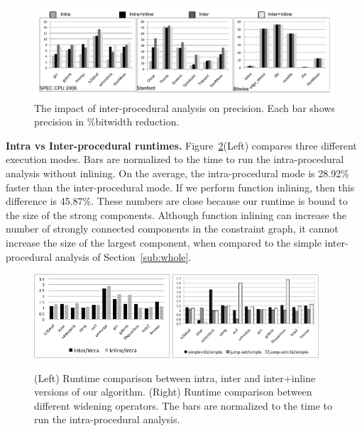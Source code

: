 \documentclass[preprint]{elsarticle}
\begin{document}
\begin{figure}[t!]
\begin{center}
\includegraphics[width=\textwidth]{images/wholeImpact}
\end{center}
\caption{\label{fig:wholeImpact}
The impact of inter-procedural analysis on precision. Each bar shows precision
in \%bitwidth reduction.}
\end{figure}

\noindent
\textbf{Intra vs Inter-procedural runtimes.}
Figure~\ref{fig:timeComp}(Left) compares three different execution modes.
Bars are normalized to the time to run the intra-procedural analysis
without inlining.
On the average, the intra-procedural mode is 28.92\% faster than the
inter-procedural mode.
If we perform function inlining, then this difference is 45.87\%.
These numbers are close because our runtime is bound to the
size of the strong components.
Although function inlining can increase the number of strongly connected
components in the constraint graph, it cannot increase the size of the largest
component, when compared to the simple inter-procedural analysis of
Section~\ref{sub:whole}.

\begin{figure}[t!]
\begin{center}
\includegraphics[width=0.45\textwidth]{images/timeIntraInterInline}
\includegraphics[width=0.485\textwidth]{images/timeWideningOperators}
\end{center}
\caption{\label{fig:timeComp}
(Left) Runtime comparison between intra, inter and inter+inline versions of
our algorithm.
(Right) Runtime comparison between different widening operators.
The bars are normalized to the time to run the intra-procedural analysis.
}
\end{figure}
\end{document}
